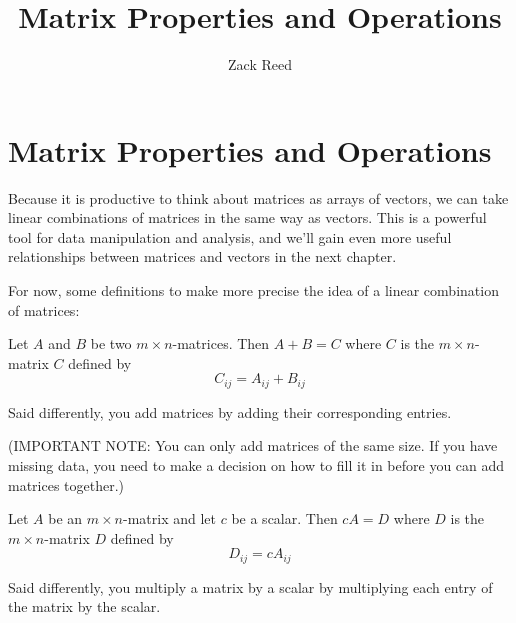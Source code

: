 \documentclass{ximera}
\author{Zack Reed} %
\title{ Matrix Properties and Operations}
\begin{document}
\begin{abstract}

\end{abstract}
\maketitle
 
\section*{Matrix Properties and Operations}

\begin{remark}

  Because it is productive to think about matrices as arrays of vectors, we can take linear combinations of matrices in the same way as vectors. This is a powerful tool for data manipulation and analysis, and we'll gain even more useful relationships between matrices and vectors in the next chapter.

  For now, some definitions to make more precise the idea of a linear combination of matrices:

  \begin{definition}
    Let $A$ and $B$ be two
    $m\times n$-matrices. Then $A+B=C$%
     where $C$ is the $m\times n$-matrix
    $C$ defined by
    \begin{equation*}
      C_{ij}=A_{ij}+B_{ij}
    \end{equation*}

    Said differently, you add matrices by adding their corresponding entries.

    (IMPORTANT NOTE: You can only add matrices of the same size. If you have missing data, you need to make a decision on how to fill it in before you can add matrices together.)
  \end{definition}

  \begin{definition}
    Let $A$ be an $m\times n$-matrix and let $c$ be a scalar. Then $cA=D$%
     where $D$ is the $m\times n$-matrix
    $D$ defined by
    \begin{equation*}
      D_{ij}=cA_{ij}
    \end{equation*}

    Said differently, you multiply a matrix by a scalar by multiplying each entry of the matrix by the scalar.
  \end{definition}

\end{remark}
\end{document}
